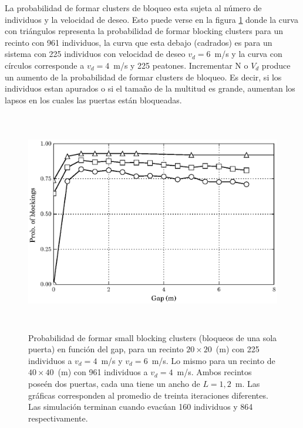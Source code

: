 La probabilidad de formar clusters de bloqueo esta sujeta al número de individuos y la velocidad de deseo. Esto puede verse en la figura \ref{proba_vsgap_all} donde la curva con triángulos representa la probabilidad de formar blocking clusters para un recinto con 961 individuos, la curva que esta debajo (cadrados) es para un sistema con 225 individuos con velocidad de deseo $v_d=6$~m/s y la curva con círculos corresponde a $v_d=4$~m/s y 225 peatones. Incrementar N o $V_d$ produce un aumento de la probabilidad de formar clusters de bloqueo. Es decir, si los individuos estan apurados o si el tamaño de la multitud es grande, aumentan los lapsos en los cuales las puertas están bloqueadas.  

\begin{figure}[H]
    \centering
    \includegraphics[height=9.7cm]{figuras/proba_vsgap_all_big.eps}
    \caption[width=5cm]{Probabilidad de formar small blocking clusters (bloqueos de una sola puerta) en función del gap, para un recinto $20\times 20$~(m) con 225 individuos a $v_d=4$~m/s y $v_d=6$~m/s. Lo mismo para un recinto de $40\times 40$~(m) con 961 individuos a $v_d=4$~m/s. Ambos recintos poseén dos puertas, cada una tiene un ancho de $L=1,2$~m. Las gráficas corresponden al promedio de treinta iteraciones diferentes. Las simulación terminan cuando evacúan 160 individuos y 864 respectivamente.}
    \label{proba_vsgap_all}
\end{figure}


